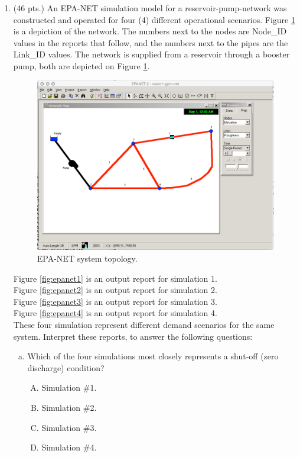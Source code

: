 \documentclass[11pt]{article}
\begin{document}
\begin{enumerate}

\clearpage
\item (46 pts.)
 An EPA-NET simulation model for a reservoir-pump-network was constructed and operated for four (4) different operational scenarios.   Figure \ref{fig:epa-net-map-gpm} is a depiction of the network.   The numbers next to the nodes are Node\_ID values in the reports that follow, and the numbers next to the pipes are the Link\_ID values.  The network is supplied from a reservoir through a booster pump, both are depicted on Figure \ref{fig:epa-net-map-gpm}. 

\begin{figure}[h!] %
\centering
   \includegraphics[width=6in]{epa-net-map-gpm.jpg}
   \caption{EPA-NET system topology.}
   \label{fig:epa-net-map-gpm} 
\end{figure}

Figure \ref{fig:epanet1} is an output report for simulation 1.   \\
Figure \ref{fig:epanet2} is an output report for simulation 2. \\  
Figure \ref{fig:epanet3} is an output report for simulation 3.  \\
Figure \ref{fig:epanet4} is an output report for simulation 4.  \\

These four simulation represent different demand scenarios for the same system.  
Interpret these reports, to answer the following questions:
\newpage
\begin{enumerate}[a)]
\item Which of the four simulations most closely represents a shut-off (zero discharge) condition?
\begin{enumerate}[A)]
\item Simulation \#1.
\item Simulation \#2.
\item Simulation \#3.
\item Simulation \#4.
\end{enumerate}


\end{enumerate}
\end{enumerate}
\end{document}
